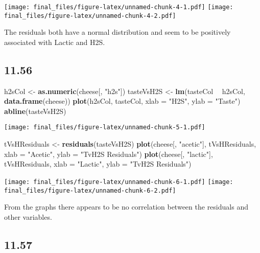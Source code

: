 \documentclass[]{article}
\newenvironment{Shaded}{\begin{snugshade}}{\end{snugshade}}
\newcommand{\DataTypeTok}[1]{\textcolor[rgb]{0.13,0.29,0.53}{#1}}
\newcommand{\KeywordTok}[1]{\textcolor[rgb]{0.13,0.29,0.53}{\textbf{#1}}}
\newcommand{\NormalTok}[1]{#1}
\newcommand{\OperatorTok}[1]{\textcolor[rgb]{0.81,0.36,0.00}{\textbf{#1}}}
\newcommand{\StringTok}[1]{\textcolor[rgb]{0.31,0.60,0.02}{#1}}
\begin{document}
\texttt{[image: final\_files/figure-latex/unnamed-chunk-4-1.pdf]}
\texttt{[image: final\_files/figure-latex/unnamed-chunk-4-2.pdf]}

The residuals both have a normal distribution and seem to be positively
associated with Lactic and H2S.

\hypertarget{section-3}{%
\subsection{11.56}\label{section-3}}

\begin{Shaded}
\begin{Highlighting}[]
\NormalTok{h2sCol <-}\StringTok{ }\KeywordTok{as.numeric}\NormalTok{(cheese[, }\StringTok{"h2s"}\NormalTok{])}
\NormalTok{tasteVsH2S <-}\StringTok{ }\KeywordTok{lm}\NormalTok{(tasteCol }\OperatorTok{~}\StringTok{ }\NormalTok{h2sCol, }\KeywordTok{data.frame}\NormalTok{(cheese))}
\KeywordTok{plot}\NormalTok{(h2sCol, tasteCol, }\DataTypeTok{xlab =} \StringTok{"H2S"}\NormalTok{, }\DataTypeTok{ylab =} \StringTok{"Taste"}\NormalTok{)}
\KeywordTok{abline}\NormalTok{(tasteVsH2S)}
\end{Highlighting}
\end{Shaded}

\texttt{[image: final\_files/figure-latex/unnamed-chunk-5-1.pdf]}

\begin{Shaded}
\begin{Highlighting}[]
\NormalTok{tVsHResiduals <-}\StringTok{ }\KeywordTok{residuals}\NormalTok{(tasteVsH2S)}
\KeywordTok{plot}\NormalTok{(cheese[, }\StringTok{"acetic"}\NormalTok{], tVsHResiduals, }\DataTypeTok{xlab =} \StringTok{"Acetic"}\NormalTok{, }\DataTypeTok{ylab =} \StringTok{"TvH2S Residuals"}\NormalTok{)}
\KeywordTok{plot}\NormalTok{(cheese[, }\StringTok{"lactic"}\NormalTok{], tVsHResiduals, }\DataTypeTok{xlab =} \StringTok{"Lactic"}\NormalTok{, }\DataTypeTok{ylab =} \StringTok{"TvH2S Residuals"}\NormalTok{)}
\end{Highlighting}
\end{Shaded}

\texttt{[image: final\_files/figure-latex/unnamed-chunk-6-1.pdf]}
\texttt{[image: final\_files/figure-latex/unnamed-chunk-6-2.pdf]}

From the graphs there appears to be no correlation between the residuals
and other variables.

\hypertarget{section-4}{%
\subsection{11.57}\label{section-4}}
\end{document}

